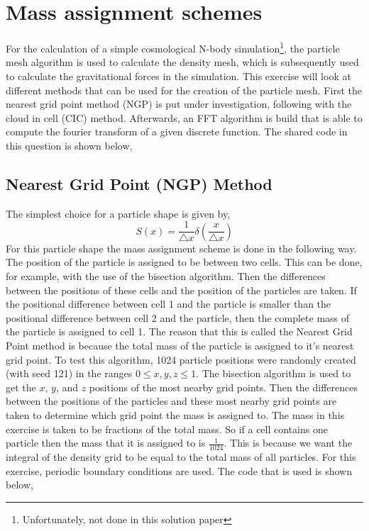 \section{Mass assignment schemes}
For the calculation of a simple cosmological N-body simulation\footnote{Unfortunately, not done in this solution paper}, the particle mesh algorithm is used to calculate the density mesh, which is subsequently used to calculate the gravitational forces in the simulation. This exercise will look at different methods that can be used for the creation of the particle mesh. First the nearest grid point method (NGP) is put under investigation, following with the cloud in cell (CIC) method. Afterwards, an FFT algorithm is build that is able to compute the fourier transform of a given discrete function. The shared code in this question is shown below,



\subsection{Nearest Grid Point (NGP) Method}
The simplest choice for a particle shape is given by,
\begin{equation*}
S(x) = \frac{1}{\triangle x}\delta\left(\frac{x}{\triangle x}\right)
\end{equation*}
For this particle shape the mass assignment scheme is done in the following way. The position of the particle is assigned to be between two cells. This can be done, for example, with the use of the bisection algorithm. Then the differences between the positions of these cells and the position of the particles are taken. If the positional difference between cell 1 and the particle is smaller than the positional difference between cell 2 and the particle, then the complete mass of the particle is assigned to cell 1. The reason that this is called the Nearest Grid Point method is because the total mass of the particle is assigned to it's nearest grid point. To test this algorithm, 1024 particle positions were randomly created (with seed 121) in the ranges $0 \leq x,y,z  \leq 1$. The bisection algorithm is used to get the $x$, $y$, and $z$ positions of the most nearby grid points. Then the differences between the positions of the particles and these most nearby grid points are taken to determine which grid point the mass is assigned to. The mass in this exercise is taken to be fractions of the total mass. So if a cell contains one particle then the mass that it is assigned to is $\frac{1}{1024}$. This is because we want the integral of the density grid to be equal to the total mass of all particles. For this exercise, periodic boundary conditions are used. The code that is used is shown below,

